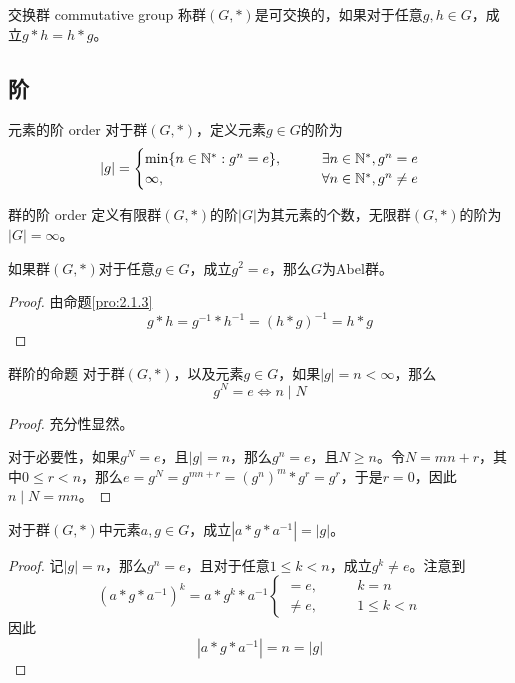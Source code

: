 \begin{definition}{交换群 commutative group}
	称群$(G,*)$是可交换的，如果对于任意$g,h\in G$，成立$g*h=h*g$。
\end{definition}

\subsection{阶}

\begin{definition}{元素的阶 order}
	对于群$(G,*)$，定义元素$g\in G$的阶为
	$$
	|g|=\begin{cases}
		\min\{ n\in\mathbb{N}^*:g^n=e \},\qquad & \exists n\in\mathbb{N}^*, g^n=e\\
		\infty,\qquad & \forall n\in\mathbb{N}^*,g^n\ne e
	\end{cases}
	$$
\end{definition}

\begin{definition}{群的阶 order}
	定义有限群$(G,*)$的阶$|G|$为其元素的个数，无限群$(G,*)$的阶为$|G|=\infty$。
\end{definition}

\begin{proposition}
	如果群$(G,*)$对于任意$g\in G$，成立$g^2=e$，那么$G$为Abel群。
\end{proposition}

\begin{proof}
	由命题\ref{pro:2.1.3}
	$$
	g*h=g^{-1}*h^{-1}=(h*g)^{-1}=h*g
	$$
\end{proof}

\begin{proposition}{}{群阶的命题}
	对于群$(G,*)$，以及元素$g\in G$，如果$|g|=n<\infty$，那么
	$$
	g^N=e\iff n\mid N
	$$
\end{proposition}

\begin{proof}
	充分性显然。
	
	对于必要性，如果$g^N=e$，且$|g|=n$，那么$g^n=e$，且$N\ge n$。令$N=mn+r$，其中$0\le r<n$，那么$e=g^N=g^{mn+r}=(g^n)^m*g^r=g^r$，于是$r=0$，因此$n\mid N=mn$。
\end{proof}

\begin{proposition}
	对于群$(G,*)$中元素$a,g\in G$，成立$|a*g*a^{-1}|=|g|$。
\end{proposition}

\begin{proof}
	记$|g|=n$，那么$g^n=e$，且对于任意$1\le k<n$，成立$g^k\ne e$。注意到
	$$
	(a*g*a^{-1})^k=a*g^k*a^{-1}\begin{cases}
		=e,\qquad & k=n\\
		\ne e,\qquad & 1\le k <n
	\end{cases}
	$$
	因此
	$$
	|a*g*a^{-1}|=n=|g|
	$$
\end{proof}

